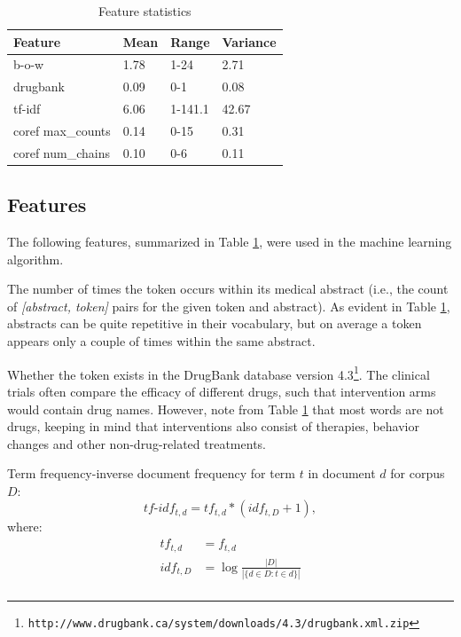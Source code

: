 \begin{table}[h]
  \begin{tabular}{llll}
      \toprule
      Feature & Mean & Range & Variance \\\midrule
      b-o-w & 1.78 & 1-24 & 2.71\\
      drugbank & 0.09 & 0-1 & 0.08\\
      tf-idf & 6.06 & 1-141.1 & 42.67\\
      coref max\_counts & 0.14 & 0-15 & 0.31\\
      coref num\_chains & 0.10 & 0-6 & 0.11\\\bottomrule
  \end{tabular}
  \caption{Feature statistics}
  \label{tab:4}
\end{table}

\subsection{Features}
\label{subsec:features}
The following features, summarized in Table \ref{tab:4}, were used in the machine learning algorithm.

 The number of times the token occurs within its medical abstract (i.e., the count of \textit{[abstract, token]} pairs for the given token and abstract). As evident in Table \ref{tab:4}, abstracts can be quite repetitive in their vocabulary, but on average a token appears only a couple of times within the same abstract.

\vspace{.25em}

 Whether the token exists in the DrugBank database version 4.3\footnote{\scriptsize {\tt http://www.drugbank.ca/system/downloads/4.3/drugbank.xml.zip}}. The clinical trials often compare the efficacy of different drugs, such that intervention arms would contain drug names. However, note from Table \ref{tab:4} that most words are not drugs, keeping in mind that interventions also consist of therapies, behavior changes and other non-drug-related treatments.

\vspace{.25em}
 Term frequency-inverse document frequency for term $t$ in document $d$ for corpus $D$:
\vspace{-.5em}
\begin{equation}\label{tfidf}
tf\text{-}idf_{t,d} = tf_{t,d} * (idf_{t,D} + 1),
\end{equation}
where:
\vspace{-1.5em}
\begin{equation*}
\begin{aligned}
tf_{t,d}& =f_{t, d}\\
idf_{t, D}& =  \log \frac{|D|}{|\{d \in D: t \in d\}|}\\
\end{aligned}
\end{equation*}

